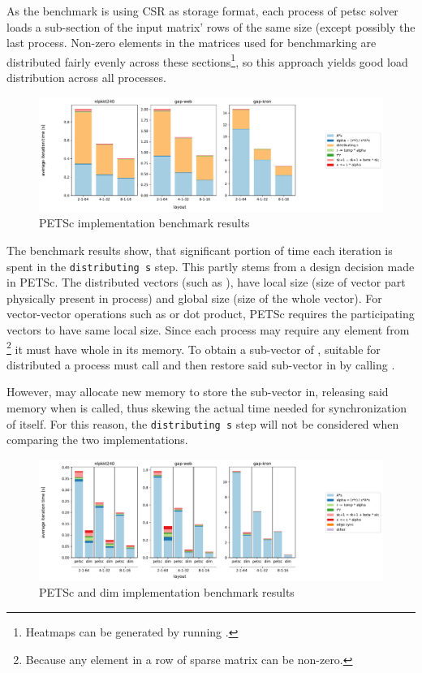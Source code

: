 \documentclass[thesis=M,english]{FITthesis}[2019/12/23]
\begin{document}
As the benchmark is using CSR as storage format,
each process of petsc solver loads a sub-section of the input matrix' rows of the same size (except possibly the last
process. Non-zero elements in the matrices used for benchmarking are distributed fairly
evenly across these sections\footnote{Heatmaps can be generated by running  .},
so this approach yields good load distribution across all processes.

\begin{figure}[htp]
    \centering
    \includegraphics[scale=0.35]{static/petsc_mpi.pdf}
    \caption{PETSc implementation benchmark results}
\end{figure}

The benchmark results show, that significant portion of time each iteration is spent in the \texttt{distributing s}
step. This partly stems from a design decision made in PETSc. The distributed vectors (such as ),
have local size (size of vector part physically present in process) and global size (size of the whole vector).
For vector-vector operations such as  or dot product, PETSc requires the participating vectors to
have same local size. Since each process may require any element from
\footnote{Because any element in a row of sparse matrix can be non-zero.} it must have whole 
in its memory. To obtain a sub-vector of , suitable for distributed  a process must call
 and then restore said sub-vector in  by calling .

However,  may allocate new memory to store the sub-vector in, releasing said memory
when  is called, thus skewing the actual time needed for synchronization of
 itself. For this reason, the \texttt{distributing s} step will not be considered when comparing
the two implementations.

\begin{figure}[htp]
    \centering
    \includegraphics[scale=0.35]{static/petsc_vs_dim.pdf}
    \caption{PETSc and dim implementation benchmark results}
\end{figure}
\end{document}
